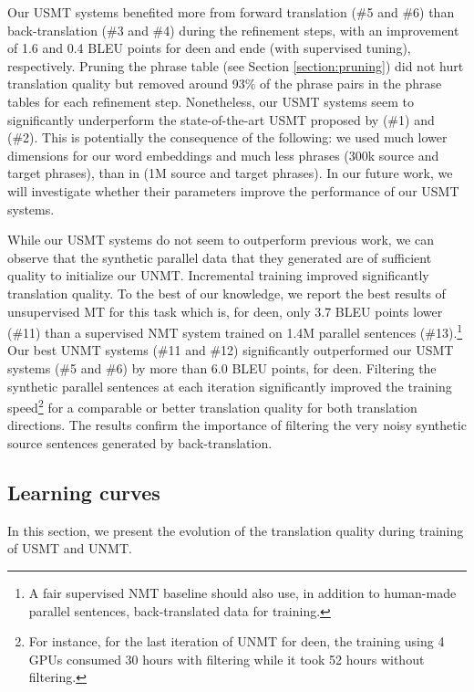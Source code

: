 \documentclass[11pt,a4paper]{article}
\begin{document}
Our USMT systems benefited more from forward translation (\#5 and \#6) than back-translation (\#3 and \#4) during the refinement steps, with an improvement of 1.6 and 0.4 BLEU points for deen and ende (with supervised tuning), respectively. Pruning the phrase table (see Section \ref{section:pruning}) did not hurt translation quality but removed around 93\% of the phrase pairs in the phrase tables for each refinement step. Nonetheless, our USMT systems seem to significantly underperform the state-of-the-art USMT proposed by \citet{DBLP:journals/corr/abs-1804-07755} (\#1) and \citet{artetxe2018unsupervised} (\#2).  This is potentially the consequence of the following: we used much lower dimensions for our word embeddings and much less phrases (300k source and target phrases), than in \citet{artetxe2018unsupervised} (1M source and target phrases). In our future work, we will investigate whether their parameters improve the performance of our USMT systems.


While our USMT systems do not seem to outperform previous work, we can observe that the synthetic parallel data that they generated are of sufficient quality to initialize our UNMT. Incremental training improved significantly translation quality. To the best of our knowledge, we report the best results of unsupervised MT for this task which is, for deen, only 3.7 BLEU points lower (\#11) than a supervised NMT system trained on 1.4M parallel sentences (\#13).\footnote{A fair supervised NMT baseline should also use, in addition to human-made parallel sentences, back-translated data for training.} Our best UNMT systems (\#11 and \#12) significantly outperformed our USMT systems (\#5 and \#6) by more than 6.0 BLEU points, for deen.
Filtering the synthetic parallel sentences at each iteration significantly improved the training speed\footnote{For instance, for the last iteration of UNMT for deen, the training using 4 GPUs consumed 30 hours with filtering while it took 52 hours without filtering.} for a comparable or better translation quality for both translation directions. The results confirm the importance of filtering the very noisy synthetic source sentences generated by back-translation.





\subsection{Learning curves}


In this section, we present the evolution of the translation quality during training of USMT and UNMT.
\end{document}
